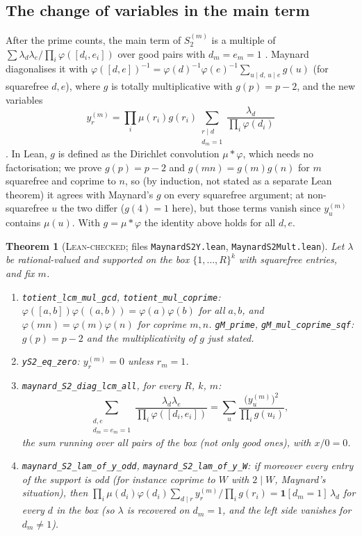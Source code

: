 \documentclass[11pt]{amsart}
\newtheorem{theorem}{Theorem}
\theoremstyle{definition}
\theoremstyle{remark}
\newcommand{\lbl}[1]{\textup{\textsc{#1}}}
\newcommand{\tl}[1]{\texttt{#1}}
\begin{document}
\subsection*{The change of variables in the main term}
After the prime counts, the main term of $S_2^{(m)}$ is a multiple of
$\sum\lambda_d\lambda_e/\prod_i\varphi([d_i,e_i])$ over good pairs with $d_m=e_m=1$
\cite[(5.18)]{May15}. Maynard diagonalises it with
$\varphi([d,e])^{-1}=\varphi(d)^{-1}\varphi(e)^{-1}\sum_{u\mid d,\,u\mid e}g(u)$ (for squarefree $d,e$),
where $g$ is totally multiplicative with $g(p)=p-2$, and the new variables
\[
y^{(m)}_r=\prod_i\mu(r_i)g(r_i)\sum_{\substack{r\mid d\\ d_m=1}}\frac{\lambda_d}{\prod_i\varphi(d_i)}
\]
\cite[(5.21)--(5.23)]{May15}. In Lean, $g$ is defined as the Dirichlet convolution
$\mu*\varphi$, which needs no factorisation; we prove $g(p)=p-2$ and
$g(mn)=g(m)g(n)$ for $m$ squarefree and coprime to $n$, so (by induction, not stated as a separate Lean theorem) it
agrees with Maynard's $g$ on every squarefree argument; at non-squarefree $u$ the two differ ($g(4)=1$ here), but those
terms vanish since $y^{(m)}_u$ contains $\mu(u)$. With $g=\mu*\varphi$ the identity above holds for all $d,e$.

\begin{theorem}[\lbl{Lean-checked}; files \tl{MaynardS2Y.lean}, \tl{MaynardS2Mult.lean}]\label{thm:s2y}
Let $\lambda$ be rational-valued and supported on the box $\{1,\dots,R\}^k$ with squarefree entries, and fix $m$.
\begin{enumerate}
\item \tl{totient\_lcm\_mul\_gcd}, \tl{totient\_mul\_coprime}: $\varphi([a,b])\varphi((a,b))=\varphi(a)\varphi(b)$ for all
$a,b$, and $\varphi(mn)=\varphi(m)\varphi(n)$ for coprime $m,n$. \tl{gM\_prime},
\tl{gM\_mul\_coprime\_sqf}: $g(p)=p-2$ and the multiplicativity of $g$ just stated.
\item \tl{yS2\_eq\_zero}: $y^{(m)}_r=0$ unless $r_m=1$.
\item \tl{maynard\_S2\_diag\_lcm\_all}, for every $R$, $k$, $m$:
\[
\sum_{\substack{d,e\\ d_m=e_m=1}}\frac{\lambda_d\lambda_e}{\prod_i\varphi([d_i,e_i])}
=\sum_u\frac{\big(y^{(m)}_u\big)^2}{\prod_ig(u_i)},
\]
the sum running over all pairs of the box (not only good ones), with $x/0=0$.
\item \tl{maynard\_S2\_lam\_of\_y\_odd}, \tl{maynard\_S2\_lam\_of\_y\_W}: if moreover every entry of the
support is odd (for instance coprime to $W$ with $2\mid W$, Maynard's situation), then
$\prod_i\mu(d_i)\varphi(d_i)\sum_{d\mid r}y^{(m)}_r/\prod_ig(r_i)=\mathbf 1[d_m=1]\,\lambda_d$
for every $d$ in the box (so $\lambda$ is recovered on $d_m=1$, and the left side vanishes for $d_m\ne1$).
\end{enumerate}
\end{theorem}
\end{document}
